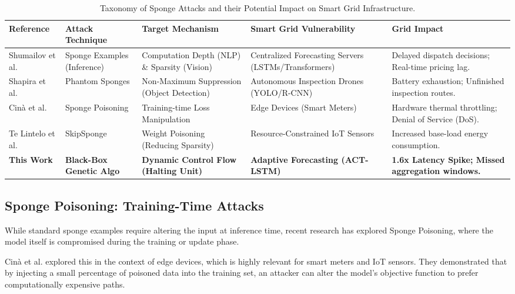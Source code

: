 \documentclass[conference]{IEEEtran}
\begin{document}
\begin{table}[t]
    \centering
    \caption{Taxonomy of Sponge Attacks and their Potential Impact on Smart Grid Infrastructure.}
    \label{tab:literature_review}
    \renewcommand{\arraystretch}{1.3}
    \begin{tabular}{l p{3cm} p{3.5cm} p{4cm} p{3cm}}
        \toprule
        \textbf{Reference} & \textbf{Attack Technique} & \textbf{Target Mechanism} & \textbf{Smart Grid Vulnerability} & \textbf{Grid Impact} \\
        \midrule
        Shumailov et al. \cite{shumailov2021sponge} & Sponge Examples (Inference) & Computation Depth (NLP) \& Sparsity (Vision) & Centralized Forecasting Servers (LSTMs/Transformers) & Delayed dispatch decisions; Real-time pricing lag. \\
        \hline
        Shapira et al. \cite{shapira2023phantom} & Phantom Sponges & Non-Maximum Suppression (Object Detection) & Autonomous Inspection Drones (YOLO/R-CNN) & Battery exhaustion; Unfinished inspection routes. \\
        \hline
        Cinà et al. \cite{cina2022sponge} & Sponge Poisoning & Training-time Loss Manipulation & Edge Devices (Smart Meters) & Hardware thermal throttling; Denial of Service (DoS). \\
        \hline
        Te Lintelo et al. \cite{telintelo2024skip} & SkipSponge & Weight Poisoning (Reducing Sparsity) & Resource-Constrained IoT Sensors & Increased base-load energy consumption. \\
        \hline
        \textbf{This Work} & \textbf{Black-Box Genetic Algo} & \textbf{Dynamic Control Flow (Halting Unit)} & \textbf{Adaptive Forecasting (ACT-LSTM)} & \textbf{1.6x Latency Spike; Missed aggregation windows.} \\
        \bottomrule
    \end{tabular}
\end{table}

\subsection{Sponge Poisoning: Training-Time Attacks}
While standard sponge examples require altering the input at inference time, recent research has explored Sponge Poisoning, where the model itself is compromised during the training or update phase.

Cinà et al. \cite{cina2022sponge} explored this in the context of edge devices, which is highly relevant for smart meters and IoT sensors. They demonstrated that by injecting a small percentage of poisoned data into the training set, an attacker can alter the model's objective function to prefer computationally expensive paths. 
\end{document}
